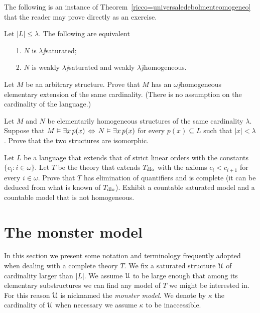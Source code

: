 \documentclass[creche.tex]{subfiles}
\begin{document}
The following is an instance of Theorem~\ref{ricco=universaledebolmenteomogeneo} that the reader may prove directly as an exercise.

\begin{corollary}\label{saturo=universaledebolmenteomogeneo}
Let $|L|\le\lambda$. The following are equivalent\nobreak
\begin{itemize}
\item[1.] $N$ is $\lambda\jj$saturated;
\item[2.] $N$ is weakly $\lambda\jj$saturated and weakly $\lambda\jj$homogeneous.\QED
\end{itemize}
\end{corollary}


\begin{exercise}\label{ex_omega_homogeneous_same_card}
Let $M$ be an arbitrary structure. Prove that $M$ has an $\omega\jj$homogeneous elementary extension of the same cardinality. (There is no assumption on the cardinality of the language.)\QED 
\end{exercise}

\begin{exercise}
Let $M$ and $N$ be elementarily homogeneous structures of the same cardinality $\lambda$. Suppose that $M\vDash\exists x\, p(x)\,\Leftrightarrow\,N\vDash\exists x\, p(x)$ for every $p(x)\subseteq L$ such that $|x|<\lambda$. Prove that the two structures are isomorphic.\QED 
\end{exercise}

\begin{exercise}\label{vaughtesempio}
Let $L$ be a language that extends that of strict linear orders with the constants $\{c_i: i\in\omega\}$. Let $T$ be the theory that extends $T_{\rm dlo}$ with the axioms $c_i<c_{i+1}$ for every  $i\in\omega$. Prove that $T$ has elimination of quantifiers and is complete (it can be deduced from what is known of $T_{\rm dlo}$). Exhibit a countable saturated model and a countable model that is not homogeneous.\QED 
\end{exercise}

\section{The monster model}\label{monster}

\label{compattezzasaturazione}


In this section we present some notation and terminology frequently adopted when dealing with a complete theory $T$. We fix a saturated structure $\EuScript U$ of cardinality larger than $|L|$. We assume $\EuScript U$ to be large enough that among its elementary substructures we can find any model of $T$ we might be interested in. For this reason $\EuScript U$ is nicknamed the \emph{monster model}. We denote by $\kappa$ the cardinality of $\EuScript U$ when necessary we assume $\kappa$ to be inaccessible. 
\end{document}
